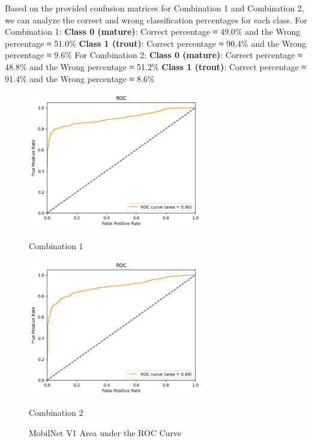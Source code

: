 Based on the provided confusion matrices for Combination 1 and Combination 2, we can analyze the correct and wrong classification percentages for each class. \newline
For Combination 1: \textbf{Class 0 (mature)}: Correct percentage ≈ 49.0\% and the Wrong percentage ≈ 51.0\%
\textbf{Class 1 (trout)}: Correct percentage ≈ 90.4\% and the Wrong percentage ≈ 9.6\%
\newline
For Combination 2: \textbf{Class 0 (mature)}: Correct percentage ≈ 48.8\% and the Wrong percentage ≈ 51.2\%
\textbf{Class 1 (trout)}: Correct percentage ≈ 91.4\% and the Wrong percentage ≈ 8.6\%


\begin{figure}[H]
    \centering
    \begin{minipage}[b]{0.49\textwidth}
        \centering
        \includegraphics[width=\textwidth, height=6cm]{Figures/unbalanced_data/without bn/mn1/roc.png}
        \captionsetup{labelformat=empty}
        \caption{Combination 1}
        \label{fig:u_wo_r_roc}
    \end{minipage}
    \hfill
    \begin{minipage}[b]{0.49\textwidth}
        \centering
        \includegraphics[width=\textwidth, height=6cm]{Figures/unbalanced_data/with bn/mn1/roc.png}
        \captionsetup{labelformat=empty}
        \caption{Combination 2}
        \label{fig:u_w_r_roc}
    \end{minipage}
    \captionsetup{labelformat=default}
    \caption{MobilNet V1 Area under the ROC Curve}
\end{figure}


